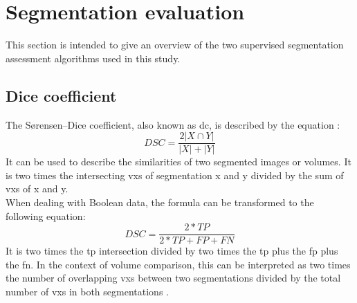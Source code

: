 \section{Segmentation evaluation}\label{s:b-seg-eval}
This section is intended to give an overview of the two supervised segmentation assessment algorithms used in this study.

\subsection{Dice coefficient}
The S\o{}rensen–Dice coefficient, also known as \acrfull{dc}, is described by the equation \cite{diceMeasuresAmountEcologic1945}:\\
\begin{equation}\label{eqn:dice-coefficient}
	DSC=\frac{2|X\cap Y|}{|X|+|Y|}
\end{equation}
\noindent
It can be used to describe the similarities of two segmented images or volumes.
It is two times the intersecting \glspl{vx} of segmentation x and y divided by the sum of \glspl{vx} of x and y.\\
When dealing with Boolean data, the formula can be transformed to the following equation:\\
\begin{equation}\label{eqn:binary-dice-coefficient}
	DSC=\frac{2*TP}{2*TP+FP+FN}
\end{equation}
\noindent
It is two times the \acrfull{tp} intersection divided by two times the \acrlong{tp} plus the \acrfull{fp} plus the \acrfull{fn}.
In the context of volume comparison, this can be interpreted as two times the number of overlapping \glspl{vx} between two segmentations divided by the total number of \glspl{vx} in both segmentations \cite{schelbComparisonProstateMRI2021}.\\

